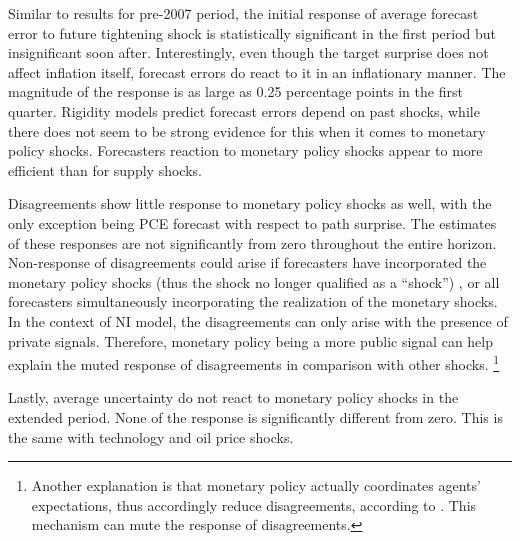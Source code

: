 \documentclass[12pt]{article}
\begin{document}
	Similar to results for pre-2007 period, the initial response of average forecast error to future tightening shock is statistically significant in the first period but insignificant soon after.  Interestingly, even though the target surprise does not affect inflation itself, forecast errors do react to it in an inflationary manner. The magnitude of the response is as large as 0.25 percentage points in the first quarter. Rigidity models predict forecast errors depend on past shocks, while there does not seem to be strong evidence for this when it comes to monetary policy shocks. Forecasters reaction to monetary policy shocks appear to more efficient than for supply shocks. 
	
	Disagreements show little response to monetary policy shocks as well, with the only exception being PCE forecast with respect to path surprise. The estimates of these responses are not  significantly from zero throughout the entire horizon. Non-response of disagreements could arise if forecasters have incorporated the monetary policy shocks (thus the shock no longer qualified as a ``shock'') , or all forecasters simultaneously incorporating the realization of the monetary shocks. In the context of NI model, the disagreements can only arise with the presence of private signals. Therefore, monetary policy being a more public signal can help explain the muted response of disagreements in comparison with other shocks. \footnote{Another explanation is that monetary policy actually coordinates agents' expectations, thus accordingly reduce disagreements, according to \citet{morris2002social}. This mechanism can mute the response of disagreements.}
	
	Lastly, average uncertainty do not react to monetary policy shocks in the extended period. None of the response is significantly different from zero. This is the same with technology and oil price shocks. 
	
\end{document}
